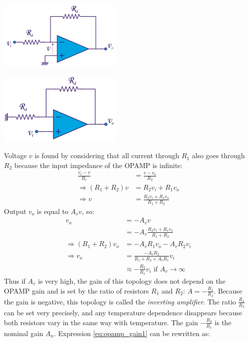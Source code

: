 \begin{minipage}{.5\textwidth}
	\centering
	\includegraphics[width=6cm]{figures/ch02/opamp3.jpg}
	\label{fig:opamp3}
\end{minipage}%
\begin{minipage}{.5\textwidth}
	\centering
	\includegraphics[width=6cm]{figures/ch02/opamp4.jpg}
	\label{fig:opamp4}
\end{minipage}
Voltage $v$ is found by considering that all current through $R_1$ also goes through $R_2$ because the input impedance of the OPAMP is infinite:
\begin{equation}
	\begin{split}
		\frac{v_i - v}{R_1} &= \frac{v - v_o}{R_2} \\
		\Rightarrow (R_1 + R_2) v &= R_2 v_i + R_1 v_o \\
		\Rightarrow v &= \frac{R_2 v_i + R_1 v_o}{R_1 + R_2}	
	\end{split}
\end{equation}
Output $v_o$ is equal to $A_v v$, so:
\begin{equation}
	\begin{split}
		v_o	&= -A_v v \\
			&= -A_v \frac{R_2 v_i + R_1 v_o}{R_1 + R_2}\\
	\Rightarrow	(R_1 + R_2) v_o	&= -A_v R_1 v_o - A_v R_2 v_i \\
	\Rightarrow v_o &= \frac{-A_v R_2}{R_1 + R_2 + A_v R_1} v_i \\
		&\approx -\frac{R_2}{R_1} v_i \text{ if } A_v \rightarrow \infty
	\end{split}
	\label{eq:opamp_gain1}
\end{equation}
Thus if $A_v$ is very high, the gain of this topology does not depend on the OPAMP gain and is set by the ratio of resistors $R_1$ and $R_2$: $A = -\frac{R_1}{R_2}$. Because the gain is negative, this topology is called the \emph{inverting amplifier}. The ratio $\frac{R_1}{R_2}$ can be set very precisely, and any temperature dependence disappears because both resistors vary in the same way with temperature. The gain $-\frac{R_2}{R_1}$ is the nominal gain $A_n$. Expression \ref{eq:opamp_gain1} can be rewritten as:
